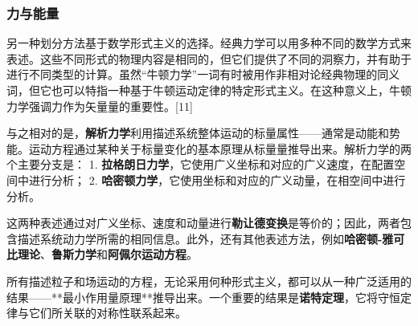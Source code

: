 \subsubsection{力与能量}  
另一种划分方法基于数学形式主义的选择。经典力学可以用多种不同的数学方式来表述。这些不同形式的物理内容是相同的，但它们提供了不同的洞察力，并有助于进行不同类型的计算。虽然“牛顿力学”一词有时被用作非相对论经典物理的同义词，但它也可以特指一种基于牛顿运动定律的特定形式主义。在这种意义上，牛顿力学强调力作为矢量量的重要性。[11]  

与之相对的是，\textbf{解析力学}利用描述系统整体运动的标量属性——通常是动能和势能。运动方程通过某种关于标量变化的基本原理从标量量推导出来。解析力学的两个主要分支是：  
1. \textbf{拉格朗日力学}，它使用广义坐标和对应的广义速度，在配置空间中进行分析；  
2. \textbf{哈密顿力学}，它使用坐标和对应的广义动量，在相空间中进行分析。  

这两种表述通过对广义坐标、速度和动量进行\textbf{勒让德变换}是等价的；因此，两者包含描述系统动力学所需的相同信息。此外，还有其他表述方法，例如\textbf{哈密顿-雅可比理论}、\textbf{鲁斯力学}和\textbf{阿佩尔运动方程}。

所有描述粒子和场运动的方程，无论采用何种形式主义，都可以从一种广泛适用的结果——**最小作用量原理**推导出来。一个重要的结果是\textbf{诺特定理}，它将守恒定律与它们所关联的对称性联系起来。